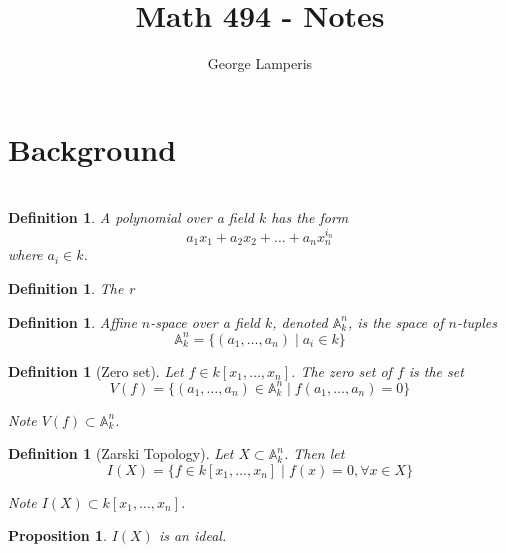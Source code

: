\documentclass[12pt]{article}
\title{Math 494 - Notes}
\author{George Lamperis}
\date{}
\theoremstyle{mystyle}
\newtheorem{prop}[thm]{Proposition}
\newtheorem{defn}[thm]{Definition}
\newcommand{\Kn}{k[x_1, \ldots, x_n]}
\newcommand{\A}[2]{\mathbb{A}^{#1}_{#2}}
\newcommand{\Ank}{\A{n}{k}}
\begin{document}
\maketitle

\section{Background}


\section{}

\begin{defn}
  A polynomial over a field $k$ has the form
  \[ a_1 x_1 + a_2 x_2 + \ldots + a_n x_n^{i_n}\]
  where $a_i \in k$.
\end{defn}

\begin{defn}
  The r
\end{defn}

\begin{defn}
  Affine $n$-space over a field $k$, denoted $\A{n}{k}$, is the space of
  $n$-tuples
  \[ \Ank = \{(a_1, \ldots, a_n) \mid a_i \in k \}\]
\end{defn}

\begin{defn}[Zero set]
  Let $f \in \Kn$. The zero set of $f$ is the set
  \[ V(f) = \{ (a_1, \ldots, a_n) \in \Ank \mid f(a_1, \ldots, a_n) = 0 \}\]
  
  Note $V(f) \subset \Ank$.
\end{defn}

\begin{defn}[Zarski Topology]
Let $X \subset \Ank$. Then let
\[ I(X) = \{ f \in k[x_1, \ldots, x_n] \mid f(x) = 0, \forall x \in X \} \]

Note $I(X) \subset \Kn$.
\end{defn}

\begin{prop}
$I(X)$ is an ideal.
\end{prop}
\end{document}
